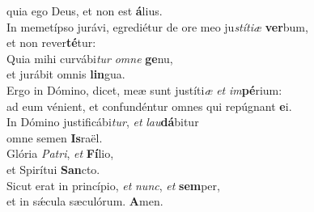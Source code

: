 \evenverse quia ego Deus, et non est \textbf{á}lius.\\
\oddverse In memetípso jurávi, egrediétur de ore meo ju\textit{stí}\textit{ti}\textit{æ} \textbf{ver}bum,~\*\\
\oddverse et non rever\textbf{té}tur:\\
\evenverse Quia mihi curvábi\textit{tur} \textit{om}\textit{ne} \textbf{ge}nu,~\*\\
\evenverse et jurábit omnis \textbf{lin}gua.\\
\oddverse Ergo in Dómino, dicet, meæ sunt justíti\textit{æ} \textit{et} \textit{im}\textbf{pé}rium:~\*\\
\oddverse ad eum vénient, et confundéntur omnes qui repúgnant \textbf{e}i.\\
\evenverse In Dómino justificábi\textit{tur}, \textit{et} \textit{lau}\textbf{dá}bitur~\*\\
\evenverse omne semen \textbf{Is}raël.\\
\oddverse Glória \textit{Pa}\textit{tri}, \textit{et} \textbf{Fí}lio,~\*\\
\oddverse et Spirítui \textbf{San}cto.\\
\evenverse Sicut erat in princípio, \textit{et} \textit{nunc}, \textit{et} \textbf{sem}per,~\*\\
\evenverse et in sǽcula sæculórum. \textbf{A}men.\\
